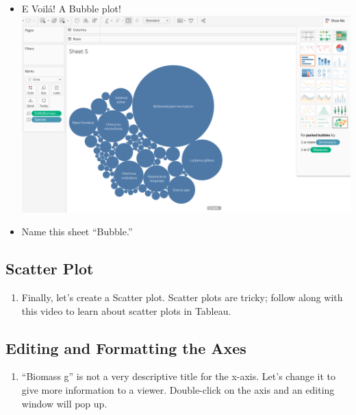 \documentclass[
]{book}
\providecommand{\tightlist}{%
  \setlength{\itemsep}{0pt}\setlength{\parskip}{0pt}}
\begin{document}
\begin{enumerate}
\begin{itemize}
  \item
    E Voilá! A Bubble plot!
    \includegraphics{images/M3S2_bubble-plot.png}
  \item
    Name this sheet ``Bubble.''
  \end{itemize}
\end{enumerate}

\hypertarget{scatter-plot}{%
\subsection{Scatter Plot}\label{scatter-plot}}

\begin{enumerate}
\def\labelenumi{\arabic{enumi}.}
\tightlist
\item
  Finally, let's create a Scatter plot. Scatter plots are tricky; follow along with this video to learn about scatter plots in Tableau.
\end{enumerate}

\hypertarget{editing-and-formatting-the-axes}{%
\subsection{Editing and Formatting the Axes}\label{editing-and-formatting-the-axes}}

\begin{enumerate}
\def\labelenumi{\arabic{enumi}.}
\tightlist
\item
  ``Biomass g'' is not a very descriptive title for the x-axis. Let's change it to give more information to a viewer. Double-click on the axis and an editing window will pop up.
\end{enumerate}
\end{document}
